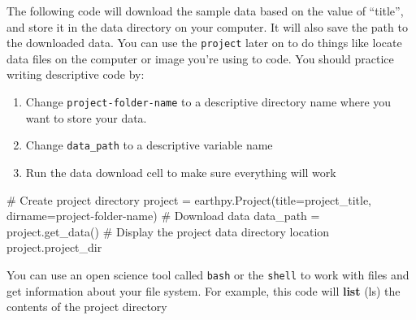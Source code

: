 \documentclass[
  letterpaper,
  DIV=11,
  numbers=noendperiod,
  oneside]{scrreprt}
\newenvironment{Shaded}{\begin{snugshade}}{\end{snugshade}}
\newcommand{\CommentTok}[1]{\textcolor[rgb]{0.37,0.37,0.37}{#1}}
\newcommand{\NormalTok}[1]{\textcolor[rgb]{0.00,0.23,0.31}{#1}}
\newcommand{\OperatorTok}[1]{\textcolor[rgb]{0.37,0.37,0.37}{#1}}
\newcommand{\StringTok}[1]{\textcolor[rgb]{0.13,0.47,0.30}{#1}}
\providecommand{\tightlist}{%
  \setlength{\itemsep}{0pt}\setlength{\parskip}{0pt}}
\begin{document}
\begin{tcolorbox}[enhanced jigsaw, colbacktitle=quarto-callout-color!10!white, opacityback=0, bottomtitle=1mm, toptitle=1mm, bottomrule=.15mm, left=2mm, colframe=quarto-callout-color-frame, leftrule=.75mm, opacitybacktitle=0.6, colback=white, rightrule=.15mm, toprule=.15mm, breakable, titlerule=0mm, title=\textcolor{quarto-callout-color}{\faInfo}\hspace{0.5em}{Try It}, coltitle=black, arc=.35mm]

The following code will download the sample data based on the value of
``title'', and store it in the data directory on your computer. It will
also save the path to the downloaded data. You can use the
\texttt{project} later on to do things like locate data files on the
computer or image you're using to code. You should practice writing
descriptive code by:

\begin{enumerate}
\def\labelenumi{\arabic{enumi}.}
\tightlist
\item
  Change
  \texttt{\textquotesingle{}project-folder-name\textquotesingle{}} to a
  descriptive directory name where you want to store your data.
\item
  Change \texttt{data\_path} to a descriptive variable name
\item
  Run the data download cell to make sure everything will work
\end{enumerate}

\end{tcolorbox}

\begin{Shaded}
\begin{Highlighting}[]
\CommentTok{\# Create project directory}
\NormalTok{project }\OperatorTok{=}\NormalTok{ earthpy.Project(title}\OperatorTok{=}\NormalTok{project\_title, dirname}\OperatorTok{=}\StringTok{\textquotesingle{}project{-}folder{-}name\textquotesingle{}}\NormalTok{)}
\CommentTok{\# Download data}
\NormalTok{data\_path }\OperatorTok{=}\NormalTok{ project.get\_data()}
\CommentTok{\# Display the project data directory location}
\NormalTok{project.project\_dir}
\end{Highlighting}
\end{Shaded}

You can use an open science tool called \texttt{bash} or the
\texttt{shell} to work with files and get information about your file
system. For example, this code will \textbf{list} (ls) the contents of
the project directory
\end{document}
